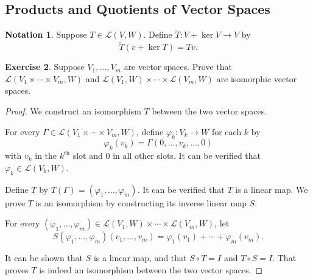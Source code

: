 \documentclass{tufte-handout}
\theoremstyle{plain} %
\newtheorem{thm}{Theorem}
\newtheorem{lem}[thm]{Lemma}
\theoremstyle{definition}
\newtheorem{notn}[thm]{Notation}
\newtheorem{exer}[thm]{Exercise}
\theoremstyle{remark}
\newcommand{\bra}[1]{\mathopen{}\left(#1\right)}
\renewcommand{\phi}{\varphi}
\renewcommand{\L}{\mathcal{L}}
\begin{document}
\subsection{Products and Quotients of Vector Spaces}


\begin{notn}
	Suppose $T\in\L\bra{V,W}$. Define $\widetilde{T}: V+\ker V \to V$ by
	\[\widetilde{T}\bra{v+\ker T}=Tv.\]
\end{notn}

\begin{exer}
	Suppose $V_1,\dots,V_m$ are vector spaces. Prove that $\L\bra{V_1\times\cdots\times V_m,W}$ and $\L\bra{V_1,W}\times\cdots\times\L\bra{V_m,W}$ are isomorphic vector spaces. 
\end{exer}
\begin{proof}
	We construct an isomorphism $T$ between the two vector spaces.
	
	For every $\Gamma\in\L\bra{V_1\times\cdots\times V_m,W}$, define $\phi_k:V_k\to W$ for each $k$ by
	\[\phi_k\bra{v_k}=\Gamma\bra{0,\dots,v_k,\dots,0}\]
	with $v_k$ in the $k^\text{th}$ slot and $0$ in all other slots. It can be verified that $\phi_k\in\L\bra{V_k,W}$.

	Define $T$ by $T\bra{\Gamma}=\bra{\phi_1,\dots,\phi_m}$. It can be verified that $T$ is a linear map. We prove $T$ is an isomorphism by constructing its inverse linear map $S$.

	For every $\bra{\phi_1,\dots,\phi_m}\in\L\bra{V_1,W}\times\cdots\times\L\bra{V_m,W}$, let
	\[S\bra{\phi_1,\dots,\phi_m}\bra{v_1,\dots,v_m}=\phi_1\bra{v_1}+\cdots+\phi_m\bra{v_m}.\]
	
	It can be shown that $S$ is a linear map, and that $S\circ T=I$ and $T\circ S=I$. That proves $T$ is indeed an isomorphism between the two vector spaces.
\end{proof}
\end{document}
